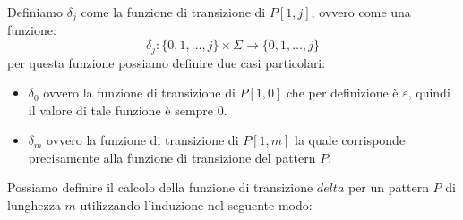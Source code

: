 Definiamo $\delta_j$ come la funzione di transizione di $P[1, j]$, ovvero come
una funzione:
\begin{equation}
    \delta_j: \{0, 1, \dots, j\} \times \Sigma \to \{0, 1, \dots, j\}
\end{equation}
per questa funzione possiamo definire due casi particolari:
\begin{itemize}
    \item $\delta_0$ ovvero la funzione di transizione di $P[1, 0]$ che per
          definizione è $\varepsilon$, quindi il valore di tale funzione è sempre $0$.
    \item $\delta_m$ ovvero la funzione di transizione di $P[1, m]$ la quale
          corrisponde precisamente alla funzione di transizione del pattern $P$.
\end{itemize}
Possiamo definire il calcolo della funzione di transizione $delta$ per un pattern
$P$ di lunghezza $m$ utilizzando l'induzione nel seguente modo:
